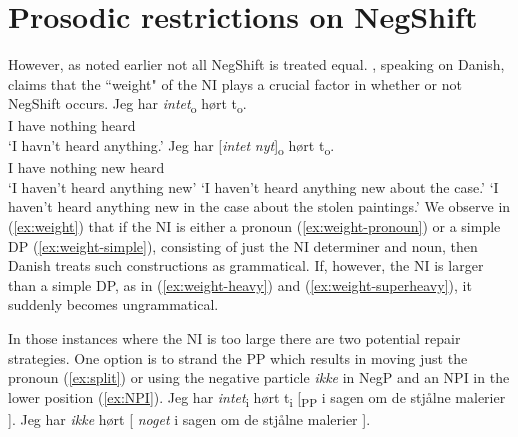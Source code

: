 \documentclass[12pt, letterpaper]{article}
\begin{document}
\section{Prosodic restrictions on NegShift} \label{sec:PROSODY}

However, as noted earlier not all NegShift is treated equal. \citet[65f]{christensenInterfacesNegationSyntax2005}, speaking on Danish, claims that the ``weight" of the NI plays a crucial factor in whether or not NegShift occurs. 
	\ea \label{ex:weight}
		\ea \label{ex:weight-pronoun}
		\gll Jeg har \textit{intet}\textsubscript{o} hørt t\textsubscript{o}.\\
		I have nothing heard\\
		\glt  `I havn't heard anything.'
		\ex \label{ex:weight-simple}
		\gll Jeg har [\textit{intet} \textit{nyt}]\textsubscript{o} hørt t\textsubscript{o}.\\
		I have nothing new heard\\
		\glt `I haven't heard anything new'
		\glt `I haven't heard anything new about the case.' \label{ex:weight-heavy}
		\glt `I haven't heard anything new in the case about the stolen paintings.' \label{ex:weight-superheavy}
		\z 
	\z
We observe in (\ref{ex:weight}) that if the NI is either a pronoun (\ref{ex:weight-pronoun}) or a simple DP (\ref{ex:weight-simple}), consisting of just the NI determiner and noun, then Danish treats such constructions as grammatical. If, however, the NI is larger than a simple DP, as in (\ref{ex:weight-heavy}) and (\ref{ex:weight-superheavy}), it suddenly becomes ungrammatical. 

In those instances where the NI is too large there are two potential repair strategies. One option is to strand the PP which results in moving just the pronoun (\ref{ex:split}) or using the negative particle \textit{ikke} in NegP and an NPI in the lower position (\ref{ex:NPI}).
	\ea 
		\ea Jeg har \textit{intet}\textsubscript{i} hørt t\textsubscript{i} [\textsubscript{PP} i sagen om de stjålne malerier ]. \label{ex:split}
		\ex Jeg har \textit{ikke} hørt [ \textit{noget} i sagen om de stjålne malerier ]. \label{ex:NPI}
		\z 
	\z  
\end{document}
